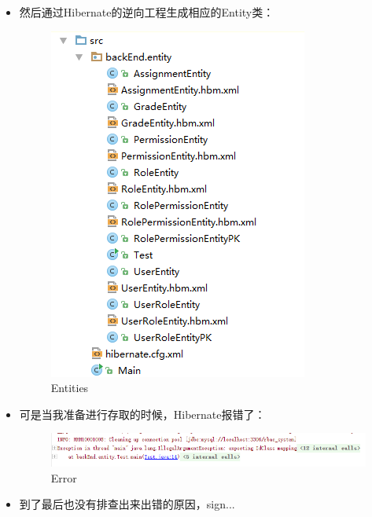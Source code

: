 \begin{itemize}
\begin{enumerate}
\begin{itemize}
			\newpage
			\item
			然后通过Hibernate的逆向工程生成相应的Entity类：
			\begin{figure}[H]
				\centering
				\includegraphics[width=\textwidth]{packages}
				\caption{Entities}
				\label{fig:packages}
			\end{figure}
			\item
			可是当我准备进行存取的时候，Hibernate报错了：
			\begin{figure}[H]
				\centering
				\includegraphics[width=\textwidth]{error}
				\caption{Error}
				\label{fig:error}
			\end{figure}
			
			\item
			到了最后也没有排查出来出错的原因，sign...
		\end{itemize}
	

\end{enumerate}
\end{itemize}
